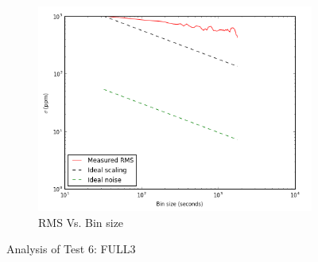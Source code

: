 \documentclass[conference]{IEEEtran}
\begin{document}
\begin{figure}[H]
    \begin{subfigure}{3}
        \includegraphics[scale=0.6]{rms_test6}
        \caption{RMS Vs. Bin size}
    \end{subfigure}
    \caption{Analysis of Test 6: FULL3}
\end{figure}
\end{document}
